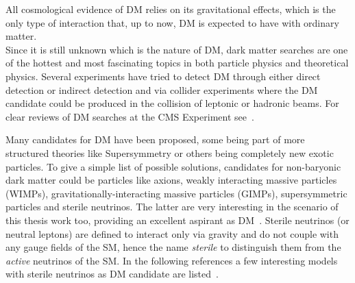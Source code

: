 All cosmological evidence of DM relies on its gravitational effects, which is the only type of interaction that, up to now, DM is expected to have with ordinary matter.\\
Since it is still unknown which is the nature of DM, dark matter searches are one of the hottest and most fascinating  topics in both particle physics and theoretical physics. Several experiments have tried to detect DM through either direct detection or indirect detection and via collider experiments where the DM candidate could be produced in the collision of leptonic or hadronic beams. For clear reviews of DM searches at the CMS Experiment see~\cite{LOWETTE2016503,Bhawna_Gomber}.

Many candidates for DM have been proposed, some being part of more structured theories like Supersymmetry or others being completely new exotic particles. To give a simple list of possible solutions, candidates for non-baryonic dark matter could be particles like axions, weakly interacting massive particles (WIMPs),  gravitationally-interacting massive particles (GIMPs), supersymmetric particles and sterile neutrinos. The latter are very interesting in the scenario of this thesis work too, providing an excellent aspirant as DM~\cite{DREWES2017250,Cline_2020}. Sterile neutrinos (or neutral leptons) are defined to interact only via gravity and do not couple with any gauge fields of the SM, hence the name \emph{sterile} to distinguish them from the \emph{active} neutrinos of the SM. In the following references a few interesting models with sterile neutrinos as DM candidate are listed~\cite{Davidson_2008,PhysRevLett.72.17,PhysRevD.64.023501,KUSENKO20091,DOLGOV2002339}.


